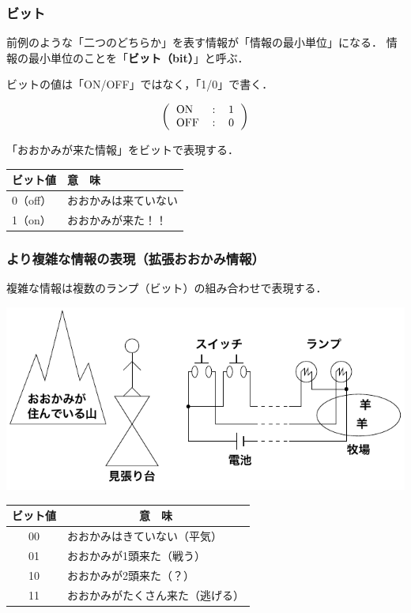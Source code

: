 \documentclass[handout]{beamer}        %
\begin{document}
\begin{frame}
  \frametitle{ビット}
  前例のような「二つのどちらか」を表す情報が「情報の最小単位」になる．
  情報の最小単位のことを「{\bf ビット（bit）}」と呼ぶ．

\begin{center}
\end{center}

ビットの値は「ON/OFF」ではなく，「1/0」で書く．
\begin{center}
{\small\[\left(\begin{tabular}{l c l}
ON  & : & 1 \\
OFF & : & 0
\end{tabular}\right)\]}
\end{center}

「おおかみが来た情報」をビットで表現する．
  \begin{center}
    \begin{tabular}{l | l}\hline\hline
      ビット値  &  意　味 \\\hline
      0（off）  & おおかみは来ていない \\
      1（on）   & おおかみが来た！！
    \end{tabular}
  \end{center}

\end{frame}

\begin{frame}
  \frametitle{より複雑な情報の表現（拡張おおかみ情報）}
  複雑な情報は複数のランプ（ビット）の組み合わせで表現する．
  \begin{center}
    \includegraphics[scale=0.8]{../Tikz/ookami2.pdf}
    {\small\begin{tabular}{c|l} \hline\hline
      ビット値 & \multicolumn{1}{c}{意　味}  \\
      \hline
      00 & おおかみはきていない（平気）      \\
      01 & おおかみが1頭来た（戦う）         \\
      10 & おおかみが2頭来た（？）           \\
      11 & おおかみがたくさん来た（逃げる）  \\
    \end{tabular}}
  \end{center}
\end{frame}
\end{document}
